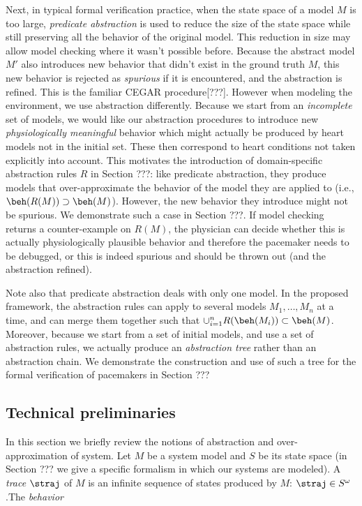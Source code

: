 Next, in typical formal verification practice, when the state space of a model $M$ is too large, \emph{predicate abstraction} is used to reduce the size of the state space while still preserving all the behavior of the original model. 
This reduction in size may allow model checking where it wasn't possible before. 
Because the abstract model $M'$ also introduces new behavior that didn't exist in the ground truth $M$, this new behavior is rejected as \emph{spurious} if it is encountered, and the abstraction is refined.
This is the familiar CEGAR procedure[???].
However when modeling the environment, we use abstraction differently. 
Because we start from an \emph{incomplete} set of models, we would like our abstraction procedures to introduce new \emph{physiologically meaningful} behavior which might actually be produced by heart models not in the initial set.
These then correspond to heart conditions not taken explicitly into account. 
This motivates the introduction of domain-specific abstraction rules $R$ in Section ???: like predicate abstraction, they produce models that over-approximate the behavior of the model they are applied to (i.e., $\beh(R(M)) \supset \beh(M)$).
However, the new behavior they introduce might not be spurious. 
We demonstrate such a case in Section ???.
If model checking returns a counter-example on $R(M)$, the physician can decide whether this is actually physiologically plausible behavior and therefore the pacemaker needs to be debugged, or this is indeed spurious and should be thrown out (and the abstraction refined).

Note also that predicate abstraction deals with only one model. 
In the proposed framework, the abstraction rules can apply to several models $M_1,\ldots,M_n$ at a time, and can merge them together such that $\cup_{i=1}^n R(\beh(M_i)) \subset \beh(M)$.
Moreover, because we start from a set of initial models, and use a set of abstraction rules, we actually produce an \emph{abstraction tree} rather than an abstraction chain.
We demonstrate the construction and use of such a tree for the formal verification of pacemakers in Section ???

\subsection{Technical preliminaries}
In this section we briefly review the notions of abstraction and over-approximation of system.
Let $M$ be a system model and $S$ be its state space (in Section ??? we give a specific formalism in which our systems are modeled).
A \emph{trace} $\straj$ of $M$ is an infinite sequence of states produced by $M$: $\straj \in S^\omega$.The \emph{behavior}
